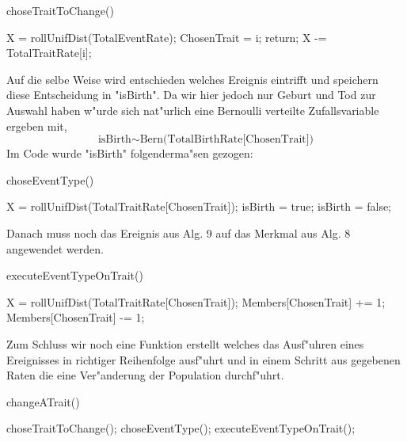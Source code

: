 \documentclass[11pt, a4paper, german]{article}
\begin{document}
	\begin{algorithm}[H]
 		\caption{choseTraitToChange()}
 		\begin{algorithmic}[1]
 			\STATE X = rollUnifDist(TotalEventRate);
 					\STATE ChosenTrait = i;
 					\STATE return;
 				\ENDIF
 				\STATE X -= TotalTraitRate[i];
 			\ENDFOR
 		\end{algorithmic}
 	\end{algorithm}
 	Auf die selbe Weise wird entschieden welches Ereignis eintrifft und speichern diese Entscheidung in "{}isBirth"{}. Da wir hier jedoch nur Geburt und Tod zur Auswahl haben w"urde sich nat"urlich eine Bernoulli verteilte Zufallsvariable ergeben mit, 
 	\[ \text{isBirth} \sim \text{Bern(TotalBirthRate[ChosenTrait])} \]
 	Im Code wurde "{}isBirth"{} folgenderma"sen gezogen:
	\begin{algorithm}[H]
 		\caption{choseEventType()}
 		\begin{algorithmic}[1]
 			\STATE X = rollUnifDist(TotalTraitRate[ChosenTrait]);
 				\STATE isBirth = true;
 			\ELSE
 				\STATE isBirth = false;
 			\ENDIF
 		\end{algorithmic}
 	\end{algorithm}
 	Danach muss noch das Ereignis aus Alg. 9 auf das Merkmal aus Alg. 8 angewendet werden.
	\begin{algorithm}[H]
 		\caption{executeEventTypeOnTrait()}
 		\begin{algorithmic}[1]
 			\STATE X = rollUnifDist(TotalTraitRate[ChosenTrait]);
 				\STATE Members[ChosenTrait] += 1;
 			\ENDIF
 				\STATE Members[ChosenTrait] -= 1;
 			\ENDIF
 		\end{algorithmic}
 	\end{algorithm} 	
 	Zum Schluss wir noch eine Funktion erstellt welches das Ausf"uhren eines Ereignisses in richtiger Reihenfolge ausf"uhrt und in einem Schritt aus gegebenen Raten die eine Ver"anderung der Population durchf"uhrt.
 	\begin{algorithm}[H]
 		\caption{changeATrait()}
 		\begin{algorithmic}[1]
 			\STATE choseTraitToChange();
 			\STATE choseEventType();
 			\STATE executeEventTypeOnTrait();
 		\end{algorithmic}
 	\end{algorithm} 
\end{document}
